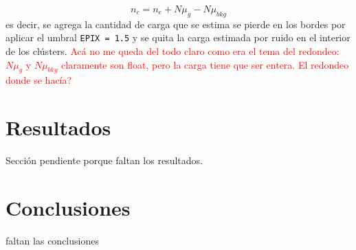 \begin{equation*}
    n_{c} = n_{e} + N\mu_{g} - N\mu_{bkg}
\end{equation*}
es decir, se agrega la cantidad de carga que se estima se pierde en los bordes por aplicar el umbral \verb|EPIX = 1.5| y se quita la carga estimada por ruido en el interior de los clústers. \textcolor{red}{Acá no me queda del todo claro como era el tema del redondeo: $N\mu_{g}$ y $N\mu_{bkg}$ claramente son float, pero la carga tiene que ser entera. El redondeo donde se hacía?}


\chapter{Resultados}
Sección pendiente porque faltan los resultados.


\chapter{Conclusiones}
faltan las conclusiones